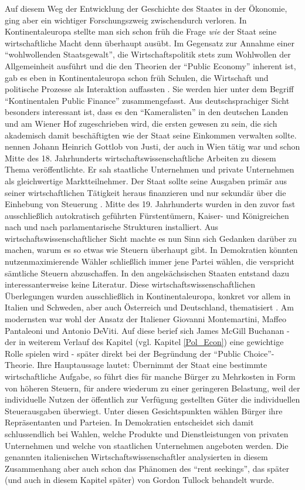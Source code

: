 Auf diesem Weg der Entwicklung der Geschichte des Staates in der Ökonomie, ging aber ein wichtiger Forschungszweig zwischendurch verloren. In Kontinentaleuropa stellte man sich schon früh die Frage \textit{wie} der Staat seine wirtschaftliche Macht denn überhaupt ausübt. Im Gegensatz zur Annahme einer "`wohlwollenden Staatsgewalt"', die Wirtschaftspolitik stets zum Wohlwollen der Allgemeinheit ausführt und die den Theorien der "`Public Economy"' inherent ist, gab es eben in Kontinentaleuropa schon früh Schulen, die Wirtschaft und politische Prozesse als Interaktion auffassten \parencite[S. 2]{Backhaus2005}. Sie werden hier unter dem Begriff "`Kontinentalen Public Finance"' zusammengefasst. Aus deutschsprachiger Sicht besonders interessant ist, dass es den "`Kameralisten"' in den deutschen Landen und am Wiener Hof zugeschrieben wird, die ersten gewesen zu sein, die sich akademisch damit beschäftigten wie der Staat seine Einkommen verwalten sollte. \textcite[S. 7]{Backhaus2005} nennen Johann Heinrich Gottlob von Justi, der auch in Wien tätig war und schon Mitte des 18. Jahrhunderts  wirtschaftswissenschaftliche Arbeiten zu diesem Thema veröffentlichte. Er sah staatliche Unternehmen und private Unternehmen als gleichwertige Marktteilnehmer. Der Staat sollte seine Ausgaben primär aus seiner wirtschaftlichen Tätigkeit heraus finanzieren und nur sekundär über die Einhebung von Steuerung \parencite[S. 10]{Backhaus2005}. Mitte des 19. Jahrhunderts wurden in den zuvor fast ausschließlich autokratisch geführten Fürstentümern, Kaiser- und Königreichen nach und nach parlamentarische Strukturen installiert. Aus wirtschaftswissenschaftlicher Sicht machte es nun Sinn sich Gedanken darüber zu machen, warum es so etwas wie Steuern überhaupt gibt. In Demokratien könnten nutzenmaximierende Wähler schließlich immer jene Partei wählen, die verspricht sämtliche Steuern abzuschaffen. In den angelsächsischen Staaten entstand dazu interessanterweise keine Literatur. Diese wirtschaftswissenschaftlichen Überlegungen wurden ausschließlich in Kontinentaleuropa, konkret vor allem in Italien und Schweden, aber auch Österreich und Deutschland, thematisiert \parencite[S. 12]{Backhaus2005}. Am modernsten war wohl der Ansatz der Italiener Giovanni Montemartini, Maffeo Pantaleoni und Antonio DeViti. Auf diese berief sich James McGill Buchanan - der in weiterem Verlauf des Kapitel (vgl. Kapitel \ref{Pol_Econ}) eine gewichtige Rolle spielen wird - später direkt bei der Begründung der "`Public Choice"'-Theorie. Ihre Hauptaussage lautet: Übernimmt der Staat eine bestimmte wirtschaftliche Aufgabe, so führt dies für manche Bürger zu Mehrkosten in Form von höheren Steuern, für andere wiederum zu einer geringeren Belastung, weil der individuelle Nutzen der öffentlich zur Verfügung gestellten Güter die individuellen Steuerausgaben überwiegt. Unter diesen Gesichtspunkten wählen Bürger ihre Repräsentanten und Parteien. In Demokratien entscheidet sich damit schlussendlich bei Wahlen, welche Produkte und Dienstleistungen von privaten Unternehmen und welche von staatlichen Unternehmen angeboten werden. Die genannten italienischen Wirtschaftswissenschaftler analysierten in diesem Zusammenhang aber auch schon das Phänomen des "`rent seekings"', das später (und auch in diesem Kapitel später) von Gordon Tullock behandelt wurde. 